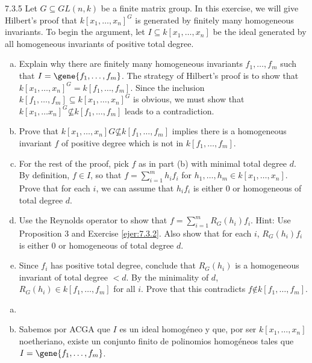 \documentclass[twoside]{article}
\begin{document}
\begin{ejercicio}{7.3.5}
Let $G ⊆ GL(n, k)$ be a finite matrix group. In this exercise, we will give Hilbert’s proof
that $k[x_1, \dots , x_n]^G$ is generated by finitely many homogeneous invariants. To begin the
argument, let $I ⊆ k[x_1, \dots , x_n]$ be the ideal generated by all homogeneous invariants of
positive total degree.
\end{ejercicio}

\begin{enumerate}[a.]
\item Explain why there are finitely many homogeneous invariants $f_1, \dots , f_m$ such that
$I = 
 \gene{f_1, \dots , f_m}$. The strategy of Hilbert’s proof is to show that $k[x_1, \dots , x_n]^G =
k[ f_1, \dots , f_m]$. Since the inclusion $k[ f_1, \dots , f_m] ⊆ k[x_1, \dots , x_n]^G$ is obvious, we must
show that $k[x_1, \dots x_n]^G \not⊆ k[ f_1, \dots , f_m]$ leads to a contradiction.
\item Prove that $k[x_1, \dots , x_n]G \not⊆ k[ f_1, \dots , f_m]$ implies there is a homogeneous invariant $f$
of positive degree which is not in $k[ f_1, \dots , f_m]$.
\item For the rest of the proof, pick $f$ as in part (b) with minimal total degree $d$. By definition,
$f ∈ I$, so that $f =
\sum^m_{i=1} h_i f_i$ for $h_1, \dots , h_m ∈ k[x_1, \dots , x_n]$. Prove that for each
$i$, we can assume that $h_i f_i$ is either 0 or homogeneous of total degree $d$.
\item Use the Reynolds operator to show that $f =\sum^m_{i=1} R_G(h_i) f_i$. Hint: Use Proposition 3
and Exercise \ref{ejer:7.3.2}. Also show that for each $i$, $R_G(h_i) f_i$ is either 0 or homogeneous of
total degree $d$.
\item Since $f_i$ has positive total degree, conclude that $R_G(h_i)$ is a homogeneous invariant of
total degree $< d$. By the minimality of $d$, $R_G(h_i) ∈ k[ f_1, \dots, f_m]$ for all $i$. Prove that
this contradicts $f \not∈ k[ f_1, \dots , f_m]$.
\end{enumerate}
\begin{solucion}
\begin{enumerate}[a.]
\item[]
\item Sabemos por ACGA que $I$ es un ideal homogéneo y que, por ser $k[x_1,\dotsc,x_n]$ noetheriano, existe un conjunto finito de polinomios homogéneos tales que $I=\gene{f_1,\dotsc,f_m}$.
\end{enumerate}
\end{solucion}
\newpage
\end{document}
